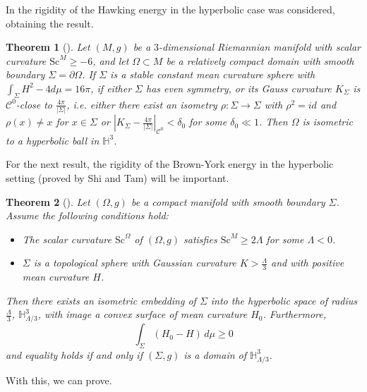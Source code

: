 \documentclass[12pt,a4paper]{amsart}
\theoremstyle{plain}
\newtheorem{theorem}{Theorem}[section]
\theoremstyle{definition}
\begin{document}
In  \cite{shi2019uniqueness, sun2017rigidity} the rigidity of  the Hawking energy in the hyperbolic case was considered, obtaining the result.
\begin{theorem}[{\cite[Theorem 3, Theorem 2]{shi2019uniqueness, sun2017rigidity}}]
     Let \((M, g)\) be a $3$-dimensional  Riemannian manifold with scalar curvature \(\mathrm{Sc}^M \geq -6 \), and let \( \Omega \subset M \) be a relatively compact domain with smooth boundary \( \Sigma = \partial \Omega \). If \( \Sigma \) is a stable  constant mean curvature  sphere with $\int_{\Sigma } H^2 -4d\mu =16 \pi   $, if either $\Sigma$ has  even symmetry, or its Gauss curvature  \( K_{\Sigma} \) is \( \mathcal{C}^0 \)-close to \( \frac{4\pi}{|\Sigma|} \), i.e. either  there exist an isometry $\rho :\Sigma \to \Sigma $ with $\rho^2 =id$ and $\rho(x)\neq x$ for $x \in \Sigma$ or \(
|K_{\Sigma} -\frac{4\pi}{|\Sigma|}|_{\mathcal{C}^0} < \delta_0
\) for some \( \delta_0 \ll 1 \).
 Then \( \Omega \) is isometric to a hyperbolic  ball in \( \mathbb{H}^3 \).
\end{theorem}
For the next result, the rigidity of the Brown-York energy in the hyperbolic setting (proved by Shi and Tam) will be important.
\begin{theorem}[{\cite[Theorem 3.8]{shi2007rigidity}}]\label{rigidityBYhyper}
Let \( (\Omega, g) \) be a compact manifold with smooth boundary \( \Sigma \). Assume the following conditions hold:
\begin{itemize}
    \item[(i)] The scalar curvature \( \mathrm{Sc}^\Omega \) of \( (\Omega, g) \) satisfies \( \mathrm{Sc}^M \geq 2\Lambda  \) for some \( \Lambda <  0 \).
    \item[(ii)] \( \Sigma \) is a topological sphere with Gaussian curvature \( K > \frac{\Lambda}{3} \) and with positive mean curvature \( H \).
\end{itemize}
 Then there exists an isometric embedding of $\Sigma$ into the hyperbolic space of radius $\tfrac{\Lambda}{3}$, $\mathbb{H}^3_{\Lambda/3}$, with image a convex surface of mean curvature $H_0$. Furthermore,
\begin{equation}
\int_{\Sigma} (H_0 - H) \, d\mu \geq 0
\end{equation}
 and equality holds if and only if \( (\Sigma, g) \) is a domain of    $\mathbb{H}^3_{\Lambda/3}$.
\end{theorem}
With this, we can prove. 
\end{document}
